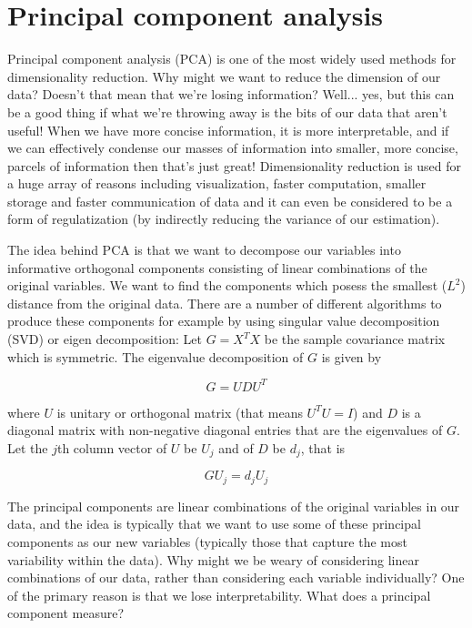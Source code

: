 

\chapter{Principal component analysis}
\label{ch:pca}



Principal component analysis (PCA) is one of the most widely used methods for dimensionality reduction. Why might we want to reduce the dimension of our data? Doesn't that mean that we're losing information? Well... yes, but this can be a good thing if what we're throwing away is the bits of our data that aren't useful! When we have more concise information, it is more interpretable, and if we can effectively condense our masses of information into smaller, more concise, parcels of information then that's just great! Dimensionality reduction is used for a huge array of reasons including visualization, faster computation, smaller storage and faster communication of data and it can even be considered to be a form of regulatization (by indirectly reducing the variance of our estimation).

The idea behind PCA is that we want to decompose our variables into informative orthogonal components consisting of linear combinations of the original variables. We want to find the components which posess the smallest ($L^2$) distance from the original data. There are a number of different algorithms to produce these components for example by using singular value decomposition (SVD) or eigen decomposition: Let $G = X^TX$ be the sample covariance matrix which is symmetric. The eigenvalue decomposition of $G$ is given by

$$G = UDU^T$$

where $U$ is unitary or orthogonal matrix (that means $U^TU = I$) and $D$ is a diagonal matrix with non-negative diagonal entries that are the eigenvalues of $G$. Let the $j$th column vector of $U$ be $U_j$ and of $D$ be $d_j$, that is

$$GU_j = d_j U_j$$

The principal components are linear combinations of the original variables in our data, and the idea is typically that we want to use some of these principal components as our new variables (typically those that capture the most variability within the data). Why might we be weary of considering linear combinations of our data, rather than considering each variable individually? One of the primary reason is that we lose interpretability. What does a principal component measure? 

